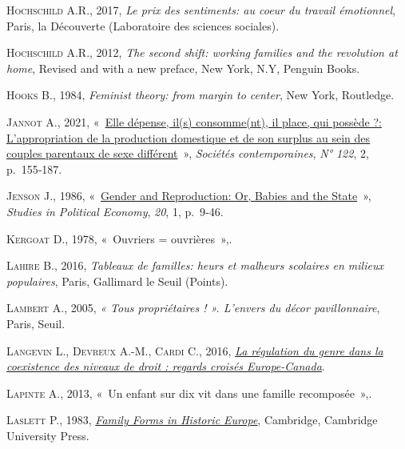 \documentclass[
  12pt,
]{book}
\newlength{\cslhangindent}
\newenvironment{CSLReferences}[2] %
 {\begin{list}{}{%
  \setlength{\itemindent}{0pt}
  \setlength{\leftmargin}{0pt}
  \setlength{\parsep}{0pt}
  \ifodd #1
   \setlength{\leftmargin}{\cslhangindent}
   \setlength{\itemindent}{-1\cslhangindent}
  \fi
  \setlength{\itemsep}{#2\baselineskip}}}
 {\end{list}}
\begin{document}
\begin{CSLReferences}{0}{1}
\textsc{Hochschild A.R.}, 2017, \emph{Le prix des sentiments: au coeur
du travail émotionnel}, Paris, la Découverte (Laboratoire des sciences
sociales).

\textsc{Hochschild A.R.}, 2012, \emph{The second shift: working families
and the revolution at home}, Revised and with a new preface, New York,
N.Y, Penguin Books.

\textsc{Hooks B.}, 1984, \emph{Feminist theory: from margin to center},
New York, Routledge.

\textsc{Jannot A.}, 2021,
{«~\href{https://doi.org/10.3917/soco.122.0155}{Elle dépense, il(s)
consomme(nt), il place, qui possède ?: L'appropriation de la production
domestique et de son surplus au sein des couples parentaux de sexe
différent}~»}, \emph{Sociétés contemporaines}, \emph{N° 122}, 2,
p.~155‑187.

\textsc{Jenson J.}, 1986,
{«~\href{https://doi.org/10.1080/19187033.1986.11675588}{Gender and
Reproduction: Or, Babies and the State}~»}, \emph{Studies in Political
Economy}, \emph{20}, 1, p.~9‑46.

\textsc{Kergoat D.}, 1978, {«~Ouvriers = ouvrières~»},.

\textsc{Lahire B.}, 2016, \emph{Tableaux de familles: heurs et malheurs
scolaires en milieux populaires}, Paris, Gallimard le Seuil (Points).

\textsc{Lambert A.}, 2005, \emph{« Tous propriétaires ! ». L{'}envers du
décor pavillonnaire}, Paris, Seuil.

\textsc{Langevin L.}, \textsc{Devreux A.-M.}, \textsc{Cardi C.}, 2016,
\emph{\href{https://utpjournals.press/doi/10.3138/cjwl.28.3.ix}{La
régulation du genre dans la coexistence des niveaux de droit : regards
croisés Europe-Canada}}.

\textsc{Lapinte A.}, 2013, {«~Un enfant sur dix vit dans une famille
recomposée~»},.

\textsc{Laslett P.}, 1983,
\emph{\href{https://doi.org/10.1017/CBO9780511897535}{Family Forms in
Historic Europe}}, Cambridge, Cambridge University Press.


\end{CSLReferences}
\end{document}
